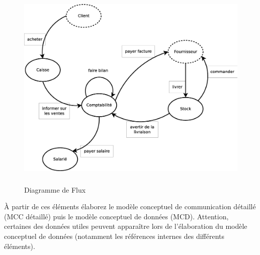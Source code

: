 \begin{figure}[!h]
    \begin{center}
    \includegraphics[height=10cm]{images/dd_exo.eps} 
    \caption{\label{DF} Diagramme de Flux}
    \end{center}
\end{figure}

À partir de ces éléments élaborez le modèle conceptuel de communication détaillé (MCC détaillé) puis le modèle conceptuel de données (MCD). Attention, certaines des données utiles peuvent apparaître lors de l'élaboration du modèle conceptuel de données (notamment les références internes des différents éléments).\\

